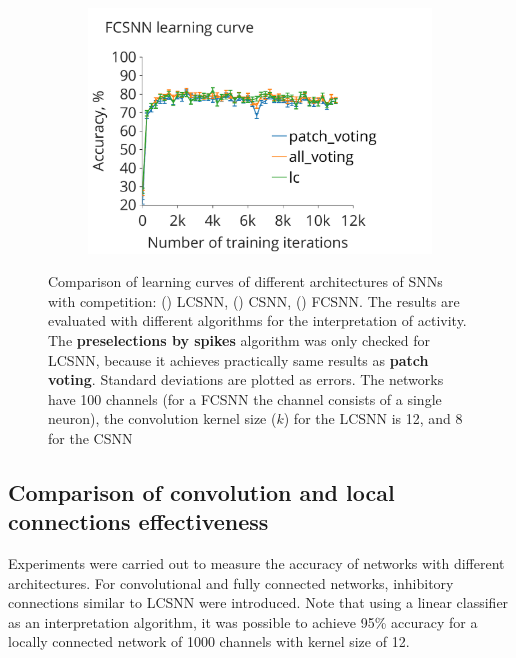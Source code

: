 \documentclass[a4paper,10pt]{article}
\begin{document}
\begin{figure}
\begin{subfigure}{0.49\textwidth}
 \caption{}
 \label{CSNN_learning_curve}
\end{subfigure} 
\begin{subfigure}{0.49\textwidth} 
    \includegraphics[width=\textwidth,keepaspectratio=true]{FCSNN_learning_rate.pdf}
 \caption{}
 \label{FCSNN_learning_curve}
\end{subfigure}
\caption{Comparison of learning curves of different architectures of SNNs with competition: () LCSNN, () CSNN, () FCSNN. The results are evaluated with different algorithms for the interpretation of activity. The \textbf{preselections by spikes} algorithm was only checked for LCSNN, because it achieves practically same results as \textbf{patch voting}. Standard deviations are plotted as errors. The networks have 100 channels (for a FCSNN the channel consists of a single neuron), the convolution kernel size ($k$) for the LCSNN is 12, and 8 for the CSNN}
\label{fig:learning_curves}
\end{figure}

\subsection{Comparison of convolution and local connections effectiveness}
Experiments were carried out to measure the accuracy of networks with different architectures. For convolutional and fully connected networks,  inhibitory connections similar to LCSNN were introduced. Note that using a linear classifier as an interpretation algorithm, it was possible to achieve 95\% accuracy for a locally connected network of 1000 channels with kernel size of 12.
\end{document}
